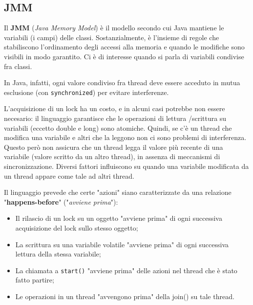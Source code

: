 \documentclass[a4paper,11pt]{article}
\begin{document}
\subsection{JMM}
Il \textbf{JMM} (\textit{Java Memory Model}) è il modello secondo cui Java mantiene le variabili (i campi) delle classi. 
Sostanzialmente, è l'insieme di regole che stabiliscono l'ordinamento degli accessi alla memoria e quando le modifiche sono visibili in modo garantito.
Ci è di interesse quando si parla di variabili condivise fra classi.

In Java, infatti, ogni valore condiviso fra thread deve essere acceduto in mutua esclusione (con \lstinline|synchronized|) per evitare interferenze.

L'acquisizione di un lock ha un costo, e in alcuni casi potrebbe non essere necesario: il linguaggio garantisce che le operazioni di lettura /scrittura su variabili (eccetto double e long) sono atomiche.
Quindi, se c'è un thread che modifica una variabile e altri che la leggono non ci sono problemi di interferenza.  
Questo però non assicura che un thread legga il valore più recente di una variabile (valore scritto da un altro thread), in assenza di meccanismi di sincronizzazione. Diversi fattori influiscono su quando una variabile modificata da un thread appare come tale ad altri thread. 

Il linguaggio prevede che certe "azioni" siano caratterizzate da una relazione "\textbf{happens-before}" ("\textit{avviene prima}"): 
\begin{itemize}
	\item Il rilascio di un lock su un oggetto "avviene prima" di ogni successiva acquisizione del lock sullo stesso oggetto;
	\item La scrittura su una variabile volatile "avviene prima" di ogni successiva lettura della stessa variabile;
	\item La chiamata a \lstinline|start()| "avviene prima" delle azioni nel thread che è stato fatto partire;
	\item Le operazioni in un thread "avvengono prima" della join() su tale thread. 
\end{itemize}
\end{document}
